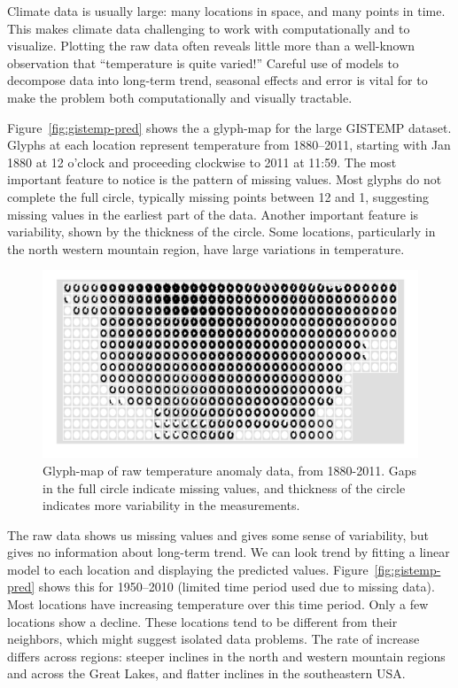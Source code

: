 \documentclass[oneside]{article}
\begin{document}
Climate data is usually large: many locations in space, and many points in time. This makes climate data challenging to work with computationally and to visualize. Plotting the raw data often reveals little more than a well-known observation that ``temperature is quite varied!'' Careful use of models to decompose data into long-term trend, seasonal effects and error is vital for to make the problem both computationally and visually tractable.

Figure~\ref{fig:gistemp-pred} shows the a glyph-map for the large GISTEMP dataset. Glyphs at each location represent temperature from 1880--2011, starting with Jan 1880 at 12 o'clock and proceeding clockwise to 2011 at 11:59. The most important feature to notice is the pattern of missing values. Most glyphs do not complete the full circle, typically missing points between 12 and 1, suggesting missing values in the earliest part of the data. Another important feature is variability, shown by the thickness of the circle. Some locations, particularly in the north western mountain region, have large variations in temperature. 

\begin{figure}[htbp]
  \centering

  \includegraphics[width=1\linewidth]{gistemp-polar-raw}

  \caption{Glyph-map of raw temperature anomaly data, from 1880-2011. Gaps in the full circle indicate missing values, and thickness of the circle indicates more variability in the measurements.}
  \label{fig:gistemp-raw}
\end{figure}

The raw data shows us missing values and gives some sense of variability, but gives no information about long-term trend. We can look trend by fitting a linear model to each location and displaying the predicted values. Figure~\ref{fig:gistemp-pred} shows this for 1950--2010 (limited time period used due to missing data). Most locations have increasing temperature over this time period. Only a few locations show a decline. These locations tend to be different from their neighbors, which might suggest isolated data problems. The rate of increase differs across regions: steeper inclines in the north and western mountain regions and across the Great Lakes, and flatter inclines in the southeastern USA.
\end{document}

